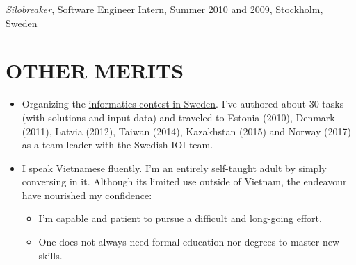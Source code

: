 \documentclass[11pt]{res} %
\begin{document}
\begin{resume}
 \emph{Silobreaker}, {\footnotesize Software Engineer Intern, Summer 2010 and 2009}, Stockholm, Sweden

\section{OTHER MERITS}

\begin{itemize} %
  \item Organizing the \href{http://progolymp.se/}{informatics contest in Sweden}.
    I've authored about
    30 tasks (with solutions and input data) and traveled to Estonia (2010),
    Denmark (2011), Latvia (2012), Taiwan (2014), Kazakhstan (2015) and Norway (2017) as a
    team leader with the Swedish IOI team.
  \item I speak Vietnamese fluently. I'm an entirely self-taught adult by simply
    conversing in it.  Although its limited use outside of
    Vietnam,  the endeavour have nourished my confidence:
    \begin{itemize}
        \item I'm capable and patient to pursue a difficult and long-going effort.
        \item One does not always need formal education nor degrees to master new skills.
    \end{itemize}
\end{itemize}

\end{resume}
\end{document}
